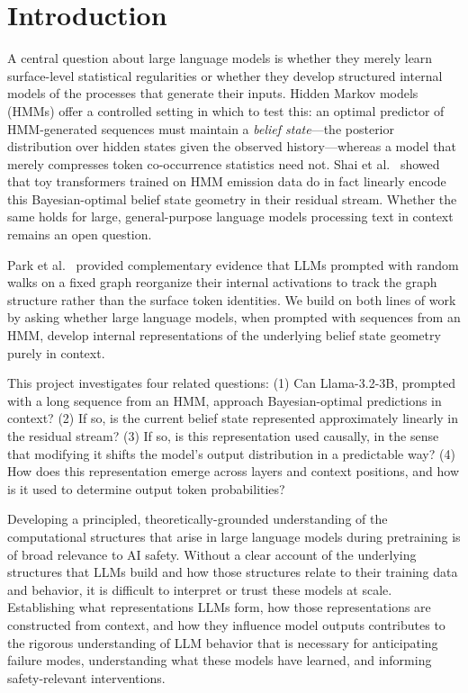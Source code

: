 \documentclass[midterm]{sparreport}
\begin{document}
\section{Introduction}

A central question about large language models is whether they merely learn surface-level statistical regularities or whether they develop structured internal models of the processes that generate their inputs. Hidden Markov models (HMMs) offer a controlled setting in which to test this: an optimal predictor of HMM-generated sequences must maintain a \emph{belief state}---the posterior distribution over hidden states given the observed history---whereas a model that merely compresses token co-occurrence statistics need not. Shai et al.~\cite{shai2024} showed that toy transformers trained on HMM emission data do in fact linearly encode this Bayesian-optimal belief state geometry in their residual stream. Whether the same holds for large, general-purpose language models processing text in context remains an open question.


Park et al.~\cite{park2025} provided complementary evidence that LLMs prompted with random walks on a fixed graph reorganize their internal activations to track the graph structure rather than the surface token identities. We build on both lines of work by asking whether large language models, when prompted with sequences from an HMM, develop internal representations of the underlying belief state geometry purely in context.

This project investigates four related questions: (1) Can Llama-3.2-3B, prompted with a long sequence from an HMM, approach Bayesian-optimal predictions in context? (2) If so, is the current belief state represented approximately linearly in the residual stream? (3) If so, is this representation used causally, in the sense that modifying it shifts the model's output distribution in a predictable way? (4) How does this representation emerge across layers and context positions, and how is it used to determine output token probabilities?

Developing a principled, theoretically-grounded understanding of the computational structures that arise in large language models during pretraining is of broad relevance to AI safety. Without a clear account of the underlying structures that LLMs build and how those structures relate to their training data and behavior, it is difficult to interpret or trust these models at scale. Establishing what representations LLMs form, how those representations are constructed from context, and how they influence model outputs contributes to the rigorous understanding of LLM behavior that is necessary for anticipating failure modes, understanding what these models have learned, and informing safety-relevant interventions.
\end{document}
